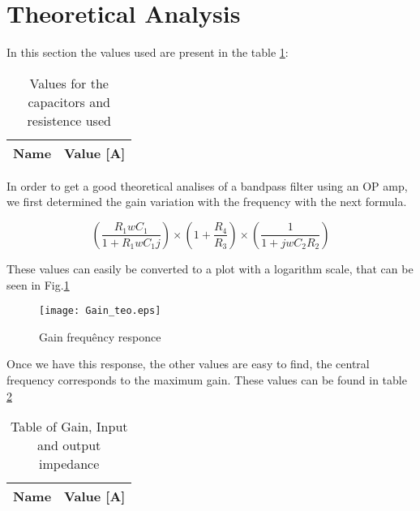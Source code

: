 \section{Theoretical Analysis}
\label{sec:analysis}

In this section the values used are present in the table \ref{tab:values}:

\begin{table}[h]
  \centering
  \begin{tabular}{|l|r|}
    \hline    
    {\bf Name} & {\bf Value [A]} \\ \hline
    
  \end{tabular}
  \caption{Values for the capacitors and resistence used}
  \label{tab:values}
\end{table}



In order to get a good theoretical analises of a bandpass filter using an OP amp, we first determined the gain variation with the frequency with the next formula.



\begin{equation}
    \left ( \frac{R_1wC_1}{1+R_1wC_1j} \right )\times\left ( 1+\frac{R_4}{R_3} \right )\times\left ( \frac{1}{1+jwC_2R_2} \right )
\end{equation}

These values can easily be converted to a plot with a logarithm scale, that can be seen in Fig.\ref{fig:gain}

\begin{figure}[!ht] 
\centering
\texttt{[image: Gain\_teo.eps]}
\caption{Gain frequêncy responce}
\label{fig:gain}
\end{figure}

Once we have this response, the other values are easy to find, the central frequency corresponds to the maximum gain.
These values can be found in table \ref{tab:values_meio}



\begin{table}[h]
  \centering
  \begin{tabular}{|l|r|}
    \hline    
    {\bf Name} & {\bf Value [A]} \\ \hline
    
  \end{tabular}
  \caption{Table of Gain, Input and output impedance}
  \label{tab:values_meio}
\end{table}



